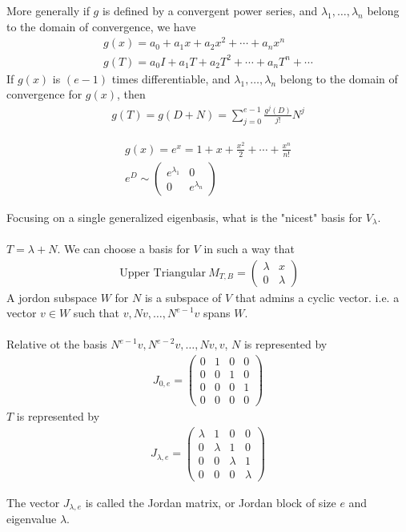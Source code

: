 \documentclass[class=scrartcl, crop=false]{standalone}
\begin{document}
More generally if $g$ is defined by a convergent power series, and $\lambda_1, \dots, \lambda_n$ belong to the domain of convergence, we have
\begin{gather*}
  g(x) = a_0 + a_1x + a_2x^2 + \cdots + a_nx^n \\
  g(T) = a_0I + a_1T + a_2T^2 + \cdots + a_nT^n + \cdots
\end{gather*} 
If $g(x)$ is $(e - 1)$ times differentiable, and $\lambda_1, \dots, \lambda_n$ belong to the domain of convergence for $g(x)$, then
\begin{gather*}
  g(T) = g(D + N) = \sum_{j = 0}^{e - 1}\frac{g^j(D)}{j!}N^j
\end{gather*} 
\begin{example}
  \begin{gather*}
    g(x) = e^x = 1 + x + \frac{x^2}{2} + \cdots + \frac{x^n}{n!} \\
    e^D \sim 
    \begin{pmatrix}
      e^{\lambda_1} & 0 \\
      0 & e^{\lambda_n} 
    \end{pmatrix} 
  \end{gather*} 
\end{example} 
Focusing on a single generalized eigenbasis, what is the "nicest" basis for $V_\lambda$.
\\\\
$T = \lambda + N$. We can choose a basis for $V$ in such a way that 
\begin{gather*}
  \ \text{Upper Triangular} \ M_{T, B} = 
  \begin{pmatrix}
    \lambda & x \\
    0 & \lambda
  \end{pmatrix} 
\end{gather*} 
A jordon subspace $W$ for $N$ is a subspace of $V$ that admins a cyclic vector. i.e. a vector $v \in W$ such that $v, Nv, \dots, N^{e - 1}v$ spans $W$.
\\\\
Relative ot the basis $N^{e - 1}v, N^{e - 2}v, \dots, Nv, v$, $N$ is represented by
\begin{gather*}
  J_{0, e} = 
  \begin{pmatrix}
    0 & 1 & 0 & 0 \\
    0 & 0 & 1 & 0 \\
    0 & 0 & 0 & 1 \\
    0 & 0 & 0 & 0 
  \end{pmatrix} 
\end{gather*} 
$T$ is represented by
\begin{gather*}
  J_{\lambda, e} = 
  \begin{pmatrix}
    \lambda & 1 & 0 & 0 \\
    0 & \lambda & 1 & 0 \\
    0 & 0 & \lambda & 1 \\
    0 & 0 & 0 & \lambda
  \end{pmatrix} 
\end{gather*} 
\begin{definition}
  The vector $J_{\lambda, e}$ is called the Jordan matrix, or Jordan block of size $e$ and eigenvalue $\lambda$.
\end{definition} 
\end{document}
